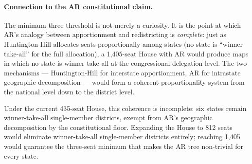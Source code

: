 \paragraph{Connection to the AR constitutional claim.}
The minimum-three threshold is not merely a curiosity.
It is the point at which AR's analogy between apportionment and redistricting
is \emph{complete}: just as Huntington-Hill allocates seats proportionally
among states (no state is ``winner-take-all'' for the full allocation),
a 1{,}405-seat House with AR would produce maps in which no state is
winner-take-all at the congressional delegation level.
The two mechanisms --- Huntington-Hill for interstate apportionment,
AR for intrastate geographic decomposition --- would form a coherent
proportionality system from the national level down to the district level.

Under the current 435-seat House, this coherence is incomplete: six states
remain winner-take-all single-member districts, exempt from AR's
geographic decomposition by the constitutional floor.
Expanding the House to 812 seats would eliminate winner-take-all single-member
districts entirely; reaching 1{,}405 would guarantee the three-seat minimum
that makes the AR tree non-trivial for every state.
